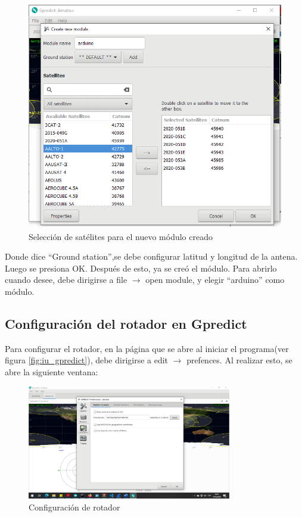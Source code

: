 \begin{figure}[ht]
	\centering
	\includegraphics[height=10cm,width=\textwidth]{select_sat}
	\caption{Selección de satélites para el nuevo módulo creado} 
	\label{fig:sel_sat}	
\end{figure}
Donde dice ``Ground station'',se debe configurar latitud y longitud de la antena. Luego se presiona OK. Después de esto, ya se creó el módulo. Para abrirlo cuando desee, debe dirigirse a file $\rightarrow$ open module, y elegir ``arduino'' como módulo.
\subsection{Configuración del rotador en Gpredict} \label{subs:conf_Gpredict}
Para configurar el rotador, en la página que se abre al iniciar el programa(ver figura	\ref{fig:iu_gpredict}), debe dirigirse a edit $\rightarrow$ prefences. Al realizar esto, se abre la siguiente ventana: 
\begin{figure}[H]
	\includegraphics[height=5cm,width=\textwidth]{select_rot}
	\caption{Configuración de rotador}
\end{figure} 

